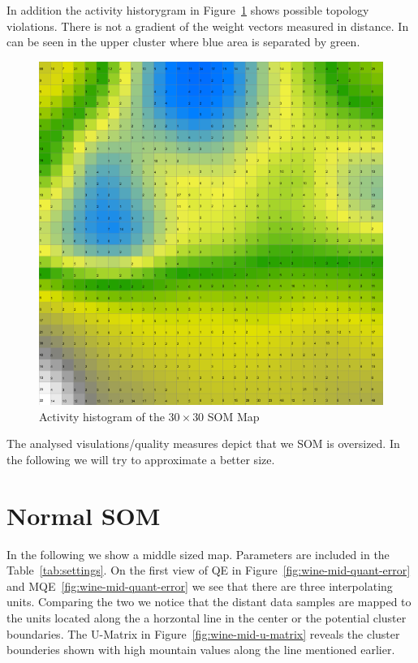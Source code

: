 \documentclass{acm_proc_article-sp}
\begin{document}
In addition the activity historygram in Figure~\ref{fig:wine-big-activity-histogram} shows possible
topology violations. There is not a gradient of the weight vectors measured in distance. In can
be seen in the upper cluster where blue area is separated by green.

\begin{figure}
\centering
\includegraphics[width=\linewidth]{img/wine-big-activity-histogram}
\caption{Activity histogram of the $30\times30$ SOM Map}
\label{fig:wine-big-activity-histogram}
\end{figure}

The analysed visulations/quality measures depict that we SOM is oversized.
In the following we will try to approximate a better size.

\section{Normal SOM}

In the following we show a middle sized map. Parameters are included in the Table~\ref{tab:settings}.
On the first view of QE in Figure~\ref{fig:wine-mid-quant-error} and MQE~\ref{fig:wine-mid-quant-error} we see
that there are three interpolating units. Comparing the two we notice that the distant data samples are
mapped to the units located along the a horzontal line in the center or the potential cluster boundaries.
The U-Matrix in Figure~\ref{fig:wine-mid-u-matrix} reveals the cluster bounderies shown with high mountain values
along the line mentioned earlier.
\end{document}
